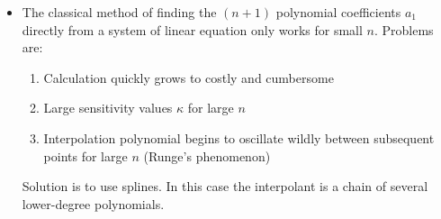 \documentclass[11pt, a4paper]{article}
\begin{document}
\begin{itemize}
	
	\item The classical method of finding the $ (n+1) $ polynomial coefficients $ a_{1} $ directly from a system of linear equation only works for small $ n $. Problems are:
	\begin{enumerate}
		\item Calculation quickly grows to costly and cumbersome
		\item Large sensitivity values $ \kappa $ for large $ n $
		\item Interpolation polynomial begins to oscillate wildly between subsequent points for large $ n $ (Runge's phenomenon)
	\end{enumerate}
	Solution is to use splines. In this case the interpolant is a chain of several lower-degree polynomials.
\end{itemize}
\end{document}
